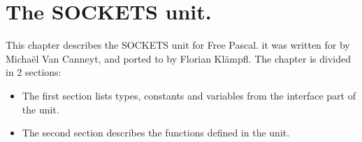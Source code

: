 %
%
%
%
%
\chapter{The SOCKETS unit.}
This chapter describes the SOCKETS unit for Free Pascal. 
it was written for \linux by Micha\"el Van Canneyt, and ported to \windows
by Florian Kl\"ampfl.
The chapter is divided in 2 sections:
\begin{itemize}
\item The first section lists types, constants and variables from the
interface part of the unit.
\item The second section describes the functions defined in the unit.
\end{itemize}
